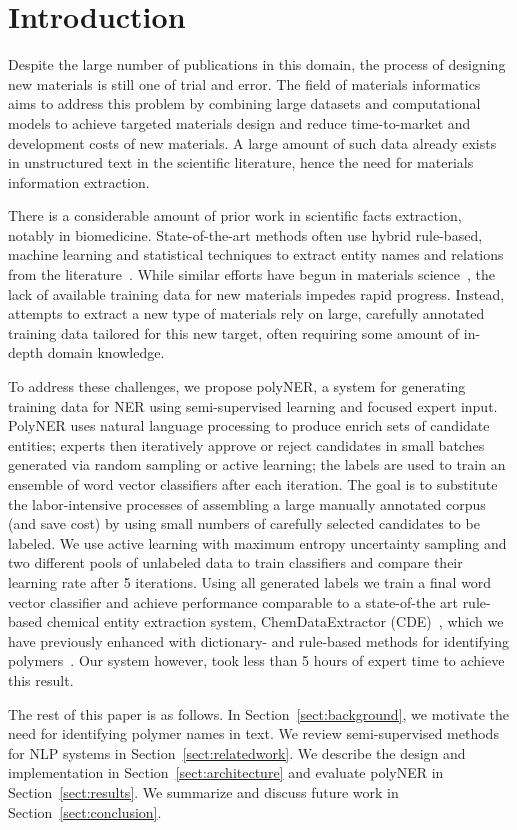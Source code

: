 \section{Introduction}
\label{sect:introduction}
Despite the large number of publications in this domain, the process of designing new materials is still one of trial and
error.
The field of materials informatics aims to address this problem by combining large datasets and computational models to achieve targeted materials design and reduce time-to-market and development costs of new materials.
A large amount of such data already exists in unstructured text in the scientific literature, hence the need for materials information extraction.

There is a considerable amount of prior work in scientific facts extraction, notably in biomedicine. 
State-of-the-art methods often use hybrid rule-based, machine learning and statistical techniques to extract entity names and relations from the literature~\cite{leaman2008banner,zeng2015survey}. 
While similar efforts have begun in materials science~\cite{hawizy2011chemicaltagger,rocktaschel2012chemspot,leaman2015tmchem,swain2016chemdataextractor}, the lack of available training data for new materials impedes rapid progress. 
Instead, attempts to extract a new type of materials rely  on large, carefully annotated training
data tailored for this new target, often requiring some amount of in-depth domain knowledge.

To address these challenges, we propose polyNER, a system for generating training data for NER using semi-supervised learning and focused expert input. 
PolyNER uses natural language processing to produce enrich sets of candidate entities;
experts then iteratively approve or reject candidates in small batches generated via random sampling or active learning;
the labels are used to train an ensemble of word vector classifiers after each iteration.
The goal is
to substitute the labor-intensive processes of assembling a large
manually annotated corpus (and save cost) by using small numbers of carefully selected candidates to be labeled. 
We use active learning with maximum entropy uncertainty sampling and two different pools of unlabeled data to train classifiers and compare their learning rate after 5 iterations. 
Using all generated labels we train a final word vector classifier and achieve performance comparable to  a state-of-the art rule-based chemical entity extraction
system, ChemDataExtractor (CDE)~\cite{swain2016chemdataextractor}, which we have previously enhanced
with dictionary- and rule-based methods for identifying polymers~\cite{tchoua2017towards}.
Our system however, took less than 5 hours of expert time to achieve this result.

The rest of this paper is as follows. 
In Section~\ref{sect:background}, we motivate the need for identifying polymer names in
text. 
We review semi-supervised methods for NLP systems in
Section~\ref{sect:relatedwork}. 
We describe the design and implementation in Section~\ref{sect:architecture} and evaluate polyNER
in Section~\ref{sect:results}. We summarize and discuss future work in Section~\ref{sect:conclusion}.